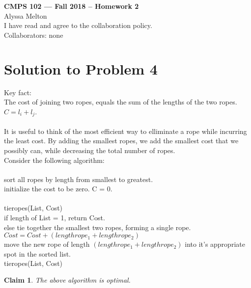 \documentclass[11pt]{article}
\newtheorem{claim}[theorem]{Claim}
\begin{document}
	
	\begin{center}
		{\bf\Large CMPS 102 --- Fall 2018 --  Homework 2}\\
		Alyssa Melton\\
		I have read and agree to the collaboration policy. \\
		Collaborators: none\\
	\end{center}
	
	
	\section*{Solution to Problem 4}
	Key fact: \\
	The cost of joining two ropes, equals the sum of the lengths of the two ropes. $C=l_i+l_j$.\\
	\\
	It is useful to think of the most efficient way to elliminate a rope while incurring the least cost. By adding the smallest ropes, we add the smallest cost that we possibly can, while decreasing the total number of ropes.\\
	Consider the following algorithm:\\
	\\
	sort all ropes by length from smallest to greatest.\\
	initialize the cost to be zero. C = 0.\\
	\\
	tieropes(List, Cost)\\
	\indent if length of List = 1, return Cost.\\
	\indent else tie together the smallest two ropes, forming a single rope.\\
	\indent $Cost = Cost + (lengthrope_1 + lengthrope_2)$\\
	\indent move the new rope of length $(lengthrope_1 + lengthrope_2)$ into it's appropriate spot in the sorted list.\\
	\indent tieropes(List, Cost)\\

	\begin{claim} 
		The above algorithm is optimal.
	\end{claim}
\end{document}
